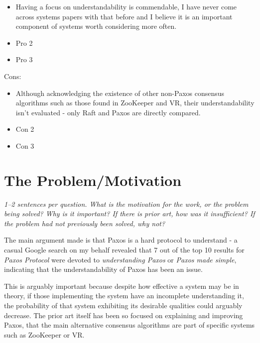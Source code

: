 \documentclass[11pt]{article}
\begin{document}
\begin{itemize}

    \item Having a focus on understandability is commendable, I have never come
    across systems papers with that before and I believe it is an important
    component of systems worth considering more often.

    \item Pro 2

    \item Pro 3

\end{itemize}

Cons:

\begin{itemize}

    \item Although acknowledging the existence of other non-Paxos consensus
    algorithms such as those found in ZooKeeper \cite{ZooKeeper} and VR, their
    understandability isn't evaluated - only Raft and Paxos are directly
    compared.

    \item Con 2

    \item Con 3

\end{itemize}

\section*{The Problem/Motivation}

\textsl{1--2 sentences per question. What is the motivation for the work, or
the problem being solved? Why is it important? If there is prior art, how was
it insufficient? If the problem had not previously been solved, why not?}

The main argument made is that Paxos is a hard protocol to understand - a
casual Google search \cite{PaxosSearch} on my behalf revealed that 7 out of the
top 10 results for \textit{Paxos Protocol} were devoted to
\textit{understanding Paxos} or \textit{Paxos made simple}, indicating that the
understandability of Paxos has been an issue.

This is arguably important because despite how effective a system may be in
theory, if those implementing the system have an incomplete understanding it,
the probability of that system exhibiting its desirable qualities could
arguably decrease. The prior art itself has been so focused on explaining and
improving Paxos, that the main alternative consensus algorithms are part of
specific systems such as ZooKeeper or VR.
\end{document}
